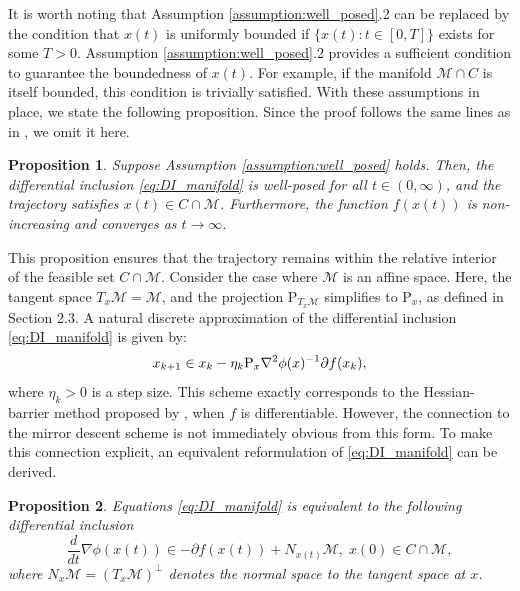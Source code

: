 \documentclass[11pt]{article}
\newcommand{\cM}{\mathcal M}
\newtheorem{proposition}{Proposition}[section]
\begin{document}
It is worth noting that Assumption \ref{assumption:well_posed}.2 can be replaced by the condition that $x(t)$ is uniformly bounded if $\{x(t):t\in[0,T]\}$ exists for some $T>0$. Assumption \ref{assumption:well_posed}.2 provides a sufficient condition to guarantee the boundedness of $x(t)$. For example, if the manifold $\mathcal{M} \cap C$ is itself bounded, this condition is trivially satisfied. With these assumptions in place, we state the following proposition. Since the proof follows the same lines as in \cite[Theorem 4.1]{alvarez2004hessian}, we omit it here. 
\begin{proposition}
\label{prop:well_pose}
Suppose Assumption \ref{assumption:well_posed} holds. Then, the differential inclusion \eqref{eq:DI_manifold} is well-posed for all $t \in (0, \infty)$, and the trajectory satisfies $x(t) \in C \cap \mathcal{M}$. Furthermore, the function $f(x(t))$ is non-increasing and converges as $t \to \infty$.
\end{proposition}
This proposition ensures that the trajectory remains within the relative interior of the feasible set $C \cap \mathcal{M}$. Consider the case where $\mathcal{M}$ is an affine space. Here, the tangent space $T_x \mathcal{M} = \mathcal{M}$, and the projection $\mathrm{P}_{T_x \mathcal{M}}$ simplifies to $\mathrm{P}_x$, as defined in Section 2.3. A natural discrete approximation of the differential inclusion \eqref{eq:DI_manifold} is given by:
\[
x_{k+1}\in x_k-\eta_k {\rm P}_x\nabla^2\phi(x)^{-1}\partial f(x_k),
\]
where $\eta_k > 0$ is a step size. This scheme exactly corresponds to the Hessian-barrier method proposed by \cite{bomze2019hessian}, when $f$ is differentiable. However, the connection to the mirror descent scheme is not immediately obvious from this form. To make this connection explicit, an equivalent reformulation of \eqref{eq:DI_manifold} can be derived.
\begin{proposition}
\label{prop:DI_equiv}
Equations \eqref{eq:DI_manifold} is equivalent to the following differential inclusion
\begin{equation}
\label{eq:DI_manifold_Breg}
\frac{d}{dt}\nabla\phi(x(t))\in-\partial f(x(t))+N_{x(t)}\cM,\;x(0)\in C\cap\cM,
\end{equation}
where $ N_x \mathcal{M} = (T_x \mathcal{M})^\perp $ denotes the normal space to the tangent space at $ x $.
\end{proposition}
\end{document}
